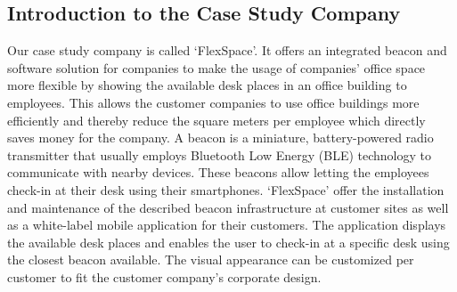 	\subsection{Introduction to the Case Study Company}
		Our case study company is called `FlexSpace'. It offers an integrated beacon and software solution for companies to make the usage of companies' office space more flexible by showing the available desk places in an office building to employees. This allows the customer companies to use office buildings more efficiently and thereby reduce the square meters per employee which directly saves money for the company. A beacon is a miniature, battery-powered radio transmitter that usually employs  Bluetooth Low Energy (BLE) technology to communicate with nearby devices. These beacons allow letting the employees check-in at their desk using their smartphones. `FlexSpace' offer the installation and maintenance of the described beacon infrastructure at customer sites as well as a white-label mobile application for their customers. The application displays the available desk places and enables the user to check-in at a specific desk using the closest beacon available. The visual appearance can be customized per customer to fit the customer company's corporate design.


